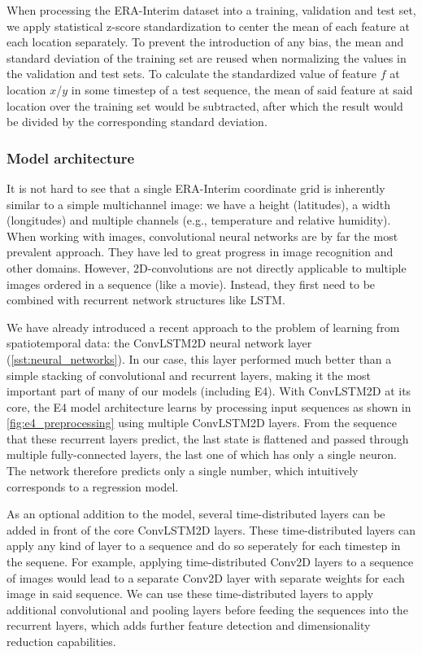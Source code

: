 When processing the ERA-Interim dataset into a training, validation and test set, we apply statistical z-score standardization to center the mean of each feature at each location separately. To prevent the introduction of any bias, the mean and standard deviation of the training set are reused when normalizing the values in the validation and test sets. To calculate the standardized value of feature $f$ at location $x$/$y$ in some timestep of a test sequence, the mean of said feature at said location over the training set would be subtracted, after which the result would be divided by the corresponding standard deviation.

\subsubsection{Model architecture}
It is not hard to see that a single ERA-Interim coordinate grid is inherently similar to a simple multichannel image: we have a height (latitudes), a width (longitudes) and multiple channels (e.g., temperature and relative humidity). When working with images, convolutional neural networks are by far the most prevalent approach. They have led to great progress in image recognition and other domains. However, 2D-convolutions are not directly applicable to multiple images ordered in a sequence (like a movie). Instead, they first need to be combined with recurrent network structures like LSTM.

We have already introduced a recent approach to the problem of learning from spatiotemporal data: the ConvLSTM2D neural network layer (\cref{sst:neural_networks}). In our case, this layer performed much better than a simple stacking of convolutional and recurrent layers, making it the most important part of many of our models (including E4). With ConvLSTM2D at its core, the E4 model architecture learns by processing input sequences as shown in \cref{fig:e4_preprocessing} using multiple ConvLSTM2D layers. From the sequence that these recurrent layers predict, the last state is flattened and passed through multiple fully-connected layers, the last one of which has only a single neuron. The network therefore predicts only a single number, which intuitively corresponds to a regression model.

As an optional addition to the model, several time-distributed layers can be added in front of the core ConvLSTM2D layers. These time-distributed layers can apply any kind of layer to a sequence and do so seperately for each timestep in the sequene. For example, applying time-distributed Conv2D layers to a sequence of images would lead to a separate Conv2D layer with separate weights for each image in said sequence. We can use these time-distributed layers to apply additional convolutional and pooling layers before feeding the sequences into the recurrent layers, which adds further feature detection and dimensionality reduction capabilities.

